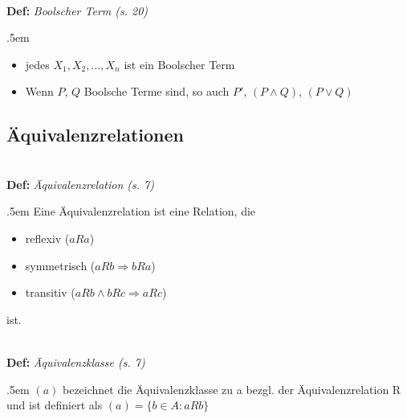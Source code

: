 \documentclass[twocolumn, 10pt]{article}
\newenvironment {definition}
                [1][]
                {\noindent\\{\bf
                Def:}\emph{
                #1}\indent\begin{addmargin}{.5em}}{\end{addmargin}}
\newcommand{\und}{\wedge}
\newcommand{\oder}{\vee}
\begin{document}
\begin{definition}[Boolscher Term (s. 20)]
\begin{itemize}
  \item jedes $X_1, X_2,\ldots ,X_n$ ist ein Boolscher Term
  \item Wenn $P$, $Q$ Boolsche Terme sind, so auch $P'$, $(P\und Q)$, $(P
  \oder Q)$
\end{itemize}
\end{definition}

\subsection*{Äquivalenzrelationen}



\begin{definition}[Äquivalenzrelation (s. 7)]
Eine Äquivalenzrelation ist eine Relation, die 
\begin{itemize}
  \item reflexiv ($aRa$)
  \item symmetrisch ($aRb \Rightarrow bRa$)
  \item transitiv ($aRb \und bRc \Rightarrow aRc$)
\end{itemize}
ist.
\end{definition}

\begin{definition}[Äquivalenzklasse (s. 7)]
$(a)$ bezeichnet die Äquivalenzklasse zu a bezgl. der Äquivalenzrelation R und
ist definiert als $(a) = \{b \in A: aRb\}$
\end{definition}
\end{document}
